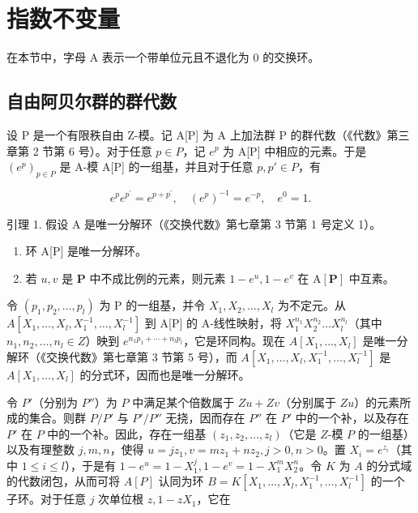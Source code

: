 \section{指数不变量}

在本节中，字母 A 表示一个带单位元且不退化为 0 的交换环。

\subsection{自由阿贝尔群的群代数}

设 P 是一个有限秩自由 Z-模。记 A{[}P{]} 为 A 上加法群 P 的群代数（《代数》第三章第 2 节第 6 号）。对于任意 \(p \in P\)，记 \(e^{p}\) 为 A{[}P{]} 中相应的元素。于是 \((e^{p})_{p \in P}\) 是 A-模 A{[}P{]} 的一组基，并且对于任意 \(p, p' \in P\)，有

\[
e ^ {p} e ^ {p ^ {\prime}} = e ^ {p + p ^ {\prime}}, \quad (e ^ {p}) ^ {- 1} = e ^ {- p}, \quad e ^ {0} = 1.
\]

引理 1. 假设 A 是唯一分解环（《交换代数》第七章第 3 节第 1 号定义 1）。

\begin{enumerate}
\def\labelenumi{(\roman{enumi})}
\item
  环 A{[}P{]} 是唯一分解环。
\item
  若 \(u, v\) 是 \(\mathbf{P}\) 中不成比例的元素，则元素 \(1 - e^u, 1 - e^v\) 在 \(\mathrm{A}[\mathbf{P}]\) 中互素。
\end{enumerate}

令 \((p_{1}, p_{2}, \ldots, p_{l})\) 为 P 的一组基，并令 \(X_{1}, X_{2}, \ldots, X_{l}\) 为不定元。从 \(A[X_{1}, \ldots, X_{l}, X_{1}^{-1}, \ldots, X_{l}^{-1}]\) 到 A{[}P{]} 的 A-线性映射，将 \(X_{1}^{n_{1}} X_{2}^{n_{2}} \ldots X_{l}^{n_{l}}\)（其中 \(n_{1}, n_{2}, \ldots, n_{l} \in Z\)）映到 \(e^{n_{1} p_{1} + \cdots + n_{l} p_{l}}\)，它是环同构。现在 \(A[X_{1}, \ldots, X_{l}]\) 是唯一分解环（《交换代数》第七章第 3 节第 5 号），而 \(A[X_{1}, \ldots, X_{l}, X_{1}^{-1}, \ldots, X_{l}^{-1}]\) 是 \(A[X_{1}, \ldots, X_{l}]\) 的分式环，因而也是唯一分解环。

令 \(P'\)（分别为 \(P''\)）为 \(P\) 中满足某个倍数属于 \(Zu + Zv\)（分别属于 \(Zu\)）的元素所成的集合。则群 \(P/P'\) 与 \(P'/P''\) 无挠，因而存在 \(P''\) 在 \(P'\) 中的一个补，以及存在 \(P'\) 在 \(P\) 中的一个补。因此，存在一组基 \((z_1, z_2, \ldots, z_l)\)（它是 \(Z\)-模 \(P\) 的一组基）以及有理整数 \(j, m, n\)，使得 \(u = jz_1, v = mz_1 + nz_2, j > 0, n > 0\)。置 \(X_i = e^{z_i}\)（其中 \(1 \leqslant i \leqslant l\)），于是有 \(1 - e^u = 1 - X_1^j, 1 - e^v = 1 - X_1^m X_2^n\)。令 \(K\) 为 \(A\) 的分式域的代数闭包，从而可将 \(A[P]\) 认同为环 \(B = K[X_1, \ldots, X_l, X_1^{-1}, \ldots, X_l^{-1}]\) 的一个子环。对于任意 \(j\) 次单位根 \(z, 1 - zX_1\)，它在

